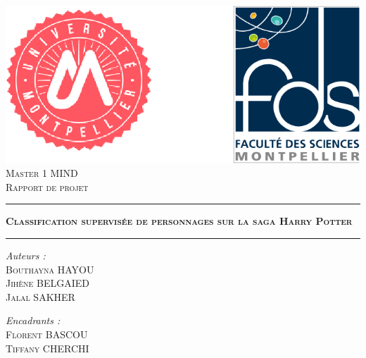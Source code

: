 \documentclass[11pt]{article}
\begin{document}
\thispagestyle{empty}
\begin{titlepage}
  \begin{sffamily}
  \begin{center}







    \includegraphics[width= 10 cm]{./figures/untitled.png}
    \\[3cm]
    \textsc{Master 1 MIND }\\
    \vspace{0.4cm}
    \textsc{Rapport de projet }\\
    \vspace{1cm}

    \hrule
    \vspace{0.4cm}
    { \huge \scshape \textbf{Classification supervisée de personnages sur la saga Harry Potter}}
    \vspace{0.4cm}
    \hrule
    \vspace{4 cm}



    \begin{minipage}{0.5\textwidth}
      \begin{flushleft} \Large
        \emph{Auteurs : }\\
        \textsc{Bouthayna HAYOU}\\
        \textsc{Jihène BELGAIED }\\
        \textsc{Jalal SAKHER}\\

      \end{flushleft}
    \end{minipage}
    \begin{minipage}{0.43\textwidth}
      \begin{flushright} \Large
        \emph{Encadrants : }\\
    \textsc{Florent BASCOU}\\
    \textsc{Tiffany CHERCHI}
      \end{flushright}
    \end{minipage}

    \vfill

  \end{center}
  \end{sffamily}
\end{titlepage}
\end{document}
